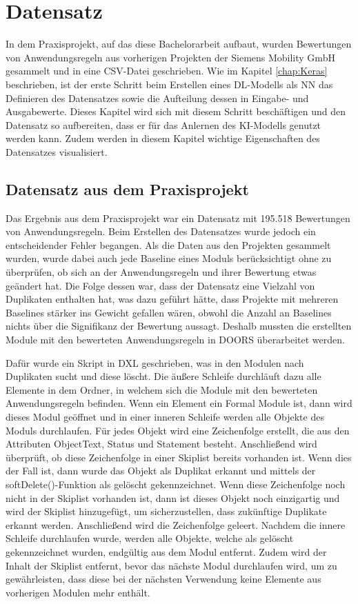 \chapter{Datensatz}
\label{chap:Datensatz}
In dem Praxisprojekt, auf das diese Bachelorarbeit aufbaut, wurden Bewertungen von Anwendungsregeln aus vorherigen Projekten der Siemens Mobility GmbH gesammelt und in eine CSV-Datei geschrieben.
Wie im Kapitel \ref{chap:Keras} beschrieben, ist der erste Schritt beim Erstellen eines \ac{DL}-Modells als \ac{NN} das Definieren des Datensatzes sowie die Aufteilung
dessen in Eingabe- und Ausgabewerte. Dieses Kapitel wird sich mit diesem Schritt beschäftigen und den Datensatz so aufbereiten, dass er für das Anlernen des \ac{KI}-Modells genutzt werden
kann. Zudem werden in diesem Kapitel wichtige Eigenschaften des Datensatzes visualisiert.

\section{Datensatz aus dem Praxisprojekt}
\label{chap:DataPraxisprojekt}
Das Ergebnis aus dem Praxisprojekt war ein Datensatz mit 195.518 Bewertungen von Anwendungsregeln. Beim Erstellen des Datensatzes wurde jedoch ein entscheidender Fehler begangen.
Als die Daten aus den Projekten gesammelt wurden, wurde dabei auch jede Baseline eines Moduls berücksichtigt ohne zu überprüfen, ob sich an der Anwendungsregeln und ihrer Bewertung
etwas geändert hat. Die Folge dessen war, dass der Datensatz eine Vielzahl von Duplikaten enthalten hat, was dazu geführt hätte, dass Projekte mit mehreren Baselines 
stärker ins Gewicht gefallen wären, obwohl die Anzahl an Baselines nichts über die Signifikanz der Bewertung aussagt. Deshalb mussten die erstellten Module mit den bewerteten Anwendungsregeln
in \ac{DOORS} überarbeitet werden. 

Dafür wurde ein Skript in \ac{DXL} geschrieben, was in den Modulen nach Duplikaten sucht und diese löscht. Die äußere Schleife durchläuft dazu alle 
Elemente in dem Ordner, in welchem sich die Module mit den bewerteten Anwendungsregeln befinden. Wenn ein Element ein Formal Module ist, 
dann wird dieses Modul geöffnet und in einer inneren Schleife werden alle Objekte des Moduls durchlaufen. Für jedes Objekt wird eine 
Zeichenfolge erstellt, die aus den Attributen ObjectText, Status und Statement besteht. Anschließend wird überprüft, ob diese Zeichenfolge
in einer Skiplist bereits vorhanden ist. Wenn dies der Fall ist, dann wurde das Objekt als Duplikat erkannt und mittels der softDelete()-Funktion
als gelöscht gekennzeichnet. Wenn diese Zeichenfolge noch nicht in der Skiplist vorhanden ist, dann ist dieses Objekt noch einzigartig und wird der Skiplist
hinzugefügt, um sicherzustellen, dass zukünftige Duplikate erkannt werden. Anschließend wird die Zeichenfolge geleert. Nachdem die innere Schleife durchlaufen wurde,
werden alle Objekte, welche als gelöscht gekennzeichnet wurden, endgültig aus dem Modul entfernt. Zudem wird der Inhalt der Skiplist entfernt, bevor das nächste Modul durchlaufen wird, um 
zu gewährleisten, dass diese bei der nächsten Verwendung keine Elemente aus vorherigen Modulen mehr enthält.

